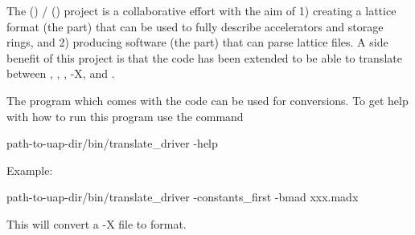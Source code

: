 The  () /  () project\cite{b:aml} is a collaborative
effort with the aim of 1) creating a lattice format (the 
part) that can be used to fully describe accelerators and storage
rings, and 2) producing software (the  part) that can parse
 lattice files. A side benefit of this project is that the
 code has been extended to be able to translate between
, \bmad, , \mad-X, and . 

The program
 which comes with the  code can be used
for conversions. To get help with how to run this program use the command
\begin{example}
  path-to-uap-dir/bin/translate_driver -help
\end{example}
Example:
\begin{example}
  path-to-uap-dir/bin/translate_driver -constants_first -bmad xxx.madx
\end{example}
This will convert a \mad-X file  to \bmad format.
